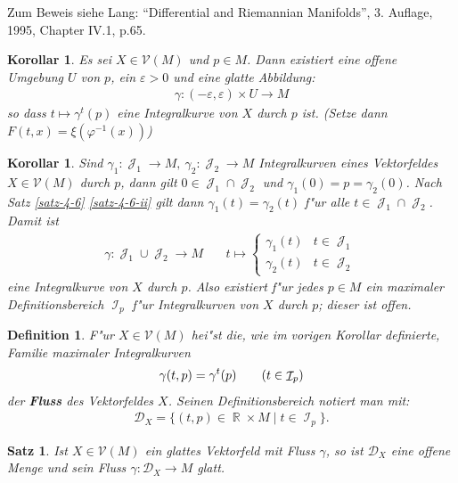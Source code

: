 \documentclass[paper=A4, twoside, chapterprefix=true, bibliography=totoc, headsepline]{scrbook}
\let\temp\phi
\let\phi\varphi
\let\varphi\temp
\let\temp\theta
\let\theta\vartheta
\let\vartheta\temp
\let\temp\epsilon
\let\epsilon\varepsilon
\let\varepsilon\temp
\let\temp\rho
\let\rho\varrho
\let\varrho\temp
\DeclareMathOperator{\R}{\mathbb{R}}
\DeclareMathOperator{\calI}{\mathcal{I}}
\DeclareMathOperator{\calJ}{\mathcal{J}}
\theoremstyle{plain}
\newtheorem{Satz}[Dfn]{Satz}
\newtheorem{Kor}[Dfn]{Korollar}
\theoremstyle{nonumberplain}
\newtheorem{dfn}{Definition}
\theoremstyle{empty}
\theoremstyle{break}
\newcommand{\CmIndex}[2][]{\ifthenelse{\isempty{#1}}{\index{#2}}{\index{#1}}#2}
\newcommand{\CmMark}[2][]{\textbf{\CmIndex[#1]{#2}}}
\begin{document}
Zum Beweis siehe Lang: "`Differential and Riemannian Manifolds"', 3. Auflage, 1995, Chapter IV.1, p.65\cite{lang1995differential}.

\begin{Kor}\label{korollar-4-7}\label{kor-4-7}
  Es sei $X \in \mathcal V(M)$ und $p \in M$. Dann existiert eine offene Umgebung $U$ von $p$, ein $\epsilon > 0$ und eine glatte Abbildung:
  \begin{align*}
    \gamma\colon(-\epsilon,\epsilon) \times U \to M
  \end{align*}
  so dass $t \mapsto \gamma^t(p)$ eine Integralkurve von $X$ durch $p$ ist. (Setze dann $F(t,x) = \xi(\phi^{-1}(x))$)
\end{Kor}

\begin{Kor}\label{korollar-4-8}
  Sind $\gamma_1 \colon \calJ_1 \to M, \ \gamma_2 \colon \calJ_2 \to M$ Integralkurven eines Vektorfeldes $X \in \mathcal V(M)$ durch $p$, dann gilt $0 \in \calJ_1 \cap \calJ_2$ und $\gamma_1(0)= p = \gamma_2(0)$.
  Nach Satz \ref{satz-4-6} \ref{satz-4-6-ii} gilt dann $\gamma_1(t) = \gamma_2(t)$ f"ur alle $t \in \calJ_1 \cap \calJ_2$. Damit ist
  \begin{align*}
    \gamma \colon \calJ_1 \cup \calJ_2 \to M && \ t \mapsto 
    \begin{cases}
      \gamma_1(t) & t \in \calJ_1\\
      \gamma_2(t) & t \in \calJ_2
    \end{cases}
  \end{align*}
  eine Integralkurve von $X$ durch $p$.
  Also existiert f"ur jedes $p \in M$ ein maximaler Definitionsbereich $\calI_p$ f"ur Integralkurven von $X$ durch $p$; dieser ist offen.
\end{Kor}

\begin{dfn}
  F"ur $X \in \mathcal V(M)$ hei"st die, wie im vorigen Korollar definierte, Familie maximaler Integralkurven
  \begin{align*}
    \gamma(t,p) = \gamma^t(p) \tag{$t \in \calI_p$}
  \end{align*}
  der \CmMark{Fluss} des Vektorfeldes $X$.
  Seinen Definitionsbereich notiert man mit:
  \begin{align*}
    \mathcal D_X = \{(t,p) \in \R \times M \mid t \in \calI_p\}.
  \end{align*}
\end{dfn}

\begin{Satz}\label{satz-4-9}
  Ist $X \in \mathcal V(M)$ ein glattes Vektorfeld mit Fluss $\gamma$, so ist $\mathcal D_X$ eine offene Menge und sein Fluss $\gamma \colon \mathcal D_X \to M$ glatt.
\end{Satz}
\end{document}
